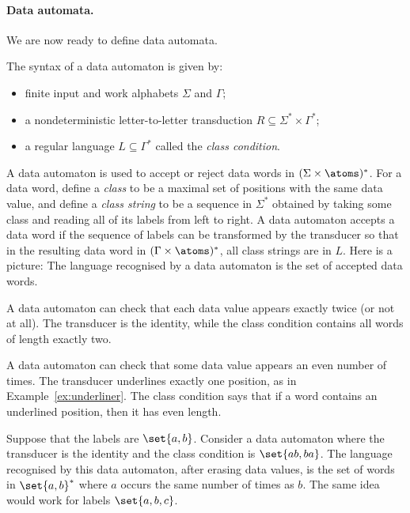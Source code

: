 \paragraph{Data automata.} We are now ready to define data automata.
\begin{definition}
The syntax of a data automaton is given by:
\begin{itemize}
	\item finite input and work alphabets $\Sigma$ and $\Gamma$;
	\item a nondeterministic letter-to-letter transduction $R \subseteq \Sigma^* \times \Gamma^*$;
	\item a regular language $L \subseteq \Gamma^*$ called the \emph{class condition}.
\end{itemize}	
\end{definition}
A data automaton is used to accept or reject data words in $(\Sigma \times \atoms)^*$. For a data word, define a \emph{class} to be a maximal set of positions with the same data value, and define a \emph{class string} to be a sequence in $\Sigma^*$ obtained by taking some class and reading all of its labels from left to right. A data automaton accepts a data word if the sequence of labels can be transformed by the transducer so that in the resulting data word in $(\Gamma \times \atoms)^*$, all class strings are in $L$. Here is a picture: 
The language recognised by a data automaton is the set of accepted data words.


\begin{myexample}
	A data automaton can check that each data value appears exactly twice (or not at all). The transducer is the identity, while the class condition contains all words of length exactly two.
\end{myexample}

\begin{myexample}
	A data automaton can check that some data value appears an even number of times. The transducer underlines exactly one position, as in Example~\ref{ex:underliner}. The class condition says that if a word contains an underlined position, then it has even length.
\end{myexample}

\begin{myexample} Suppose that the labels are $\set{a,b}$. Consider a data automaton where the transducer is the identity and the class condition is $\set{ab,ba}$. The language recognised by this data automaton, after erasing data values, is the set of words in $\set{a,b}^*$ where $a$ occurs the same number of times as $b$. The same idea would work for labels $\set{a,b,c}$.
\end{myexample}



